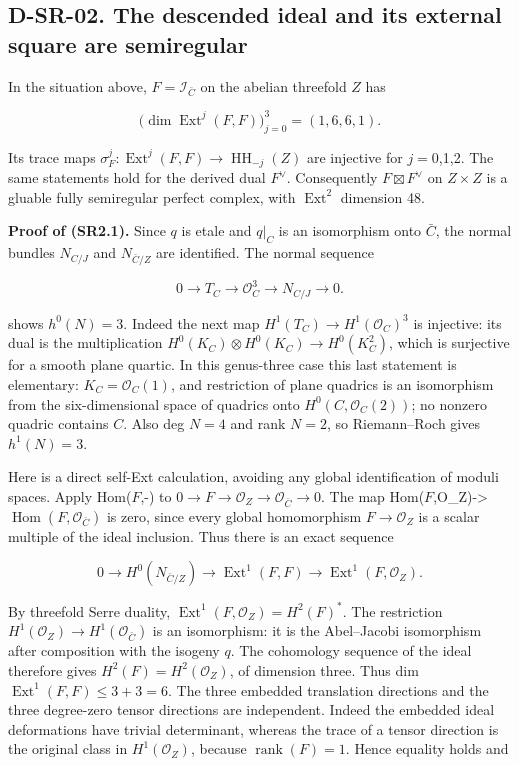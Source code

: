 \subsection{D-SR-02. The descended ideal and its external square are semiregular}
\label{D-SR-02}

In the situation above, \(F=\mathcal I_{\bar C}\) on the abelian threefold \(Z\) has

\[
\bigl(\dim\operatorname{Ext}^j(F,F)\bigr)_{j=0}^3=(1,6,6,1).\tag{SR2.1}
\]

Its trace maps \(\sigma_F^j:\operatorname{Ext}^j(F,F)\to\operatorname{HH}_{-j}(Z)\) are injective for \(j= 0\),1,2. The same statements hold for the derived dual \(F^\vee\). Consequently \(F\boxtimes F^\vee\) on \(Z\times Z\) is a gluable fully semiregular perfect complex, with \(\operatorname{Ext}^2\) dimension 48.

\textbf{Proof of (SR2.1).} Since \(q\) is etale and \(q|_C\) is an isomorphism onto \(\bar C\), the normal bundles \(N_{C/J}\) and \(N_{\bar C/Z}\) are identified. The normal sequence

\[
0\longrightarrow T_C\longrightarrow\mathcal O_C^3\longrightarrow N_{C/J}\longrightarrow0.
\]

shows \(h^0(N)=3\). Indeed the next map \(H^1(T_C)\to H^1(\mathcal O_C)^3\) is injective: its dual is the multiplication \(H^0(K_C)\otimes H^0(K_C)\to H^0(K_C^2)\), which is surjective for a smooth plane quartic. In this genus-three case this last statement is elementary: \(K_C=\mathcal O_C(1)\), and restriction of plane quadrics is an isomorphism from the six-dimensional space of quadrics onto \(H^0(C,\mathcal O_C(2))\); no nonzero quadric contains \(C\). Also deg \(N= 4\) and rank \(N= 2\), so Riemann--Roch gives \(h^1(N)=3\).

Here is a direct self-Ext calculation, avoiding any global identification of moduli spaces. Apply Hom(\(F\),-) to \(0\to F\to\mathcal O_Z\to\mathcal O_{\bar C}\to0\). The map Hom(\(F\),O\_Z)-\textgreater{}\(\operatorname{Hom}(F,\mathcal O_{\bar C})\) is zero, since every global homomorphism \(F\to\mathcal O_Z\) is a scalar multiple of the ideal inclusion. Thus there is an exact sequence

\[
0\longrightarrow H^0(N_{\bar C/Z})\longrightarrow\operatorname{Ext}^1(F,F)\longrightarrow\operatorname{Ext}^1(F,\mathcal O_Z).
\]

By threefold Serre duality, \(\operatorname{Ext}^1(F,\mathcal O_Z)=H^2(F)^*\). The restriction \(H^1(\mathcal O_Z)\to H^1(\mathcal O_{\bar C})\) is an isomorphism: it is the Abel--Jacobi isomorphism after composition with the isogeny \(q\). The cohomology sequence of the ideal therefore gives \(H^2(F)=H^2(\mathcal O_Z)\), of dimension three. Thus dim \(\operatorname{Ext}^1(F,F)\leq3+3=6\). The three embedded translation directions and the three degree-zero tensor directions are independent. Indeed the embedded ideal deformations have trivial determinant, whereas the trace of a tensor direction is the original class in \(H^1(\mathcal O_Z)\), because \(\operatorname{rank}(F)=1\). Hence equality holds and

